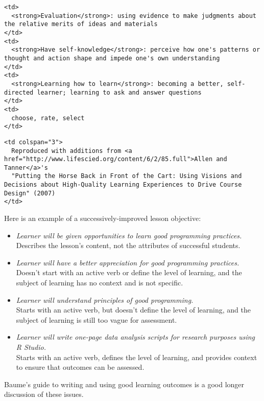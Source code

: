 \begin{verbatim}
<td>
  <strong>Evaluation</strong>: using evidence to make judgments about the relative merits of ideas and materials
</td>
<td>
  <strong>Have self-knowledge</strong>: perceive how one's patterns or thought and action shape and impede one's own understanding
</td>
<td>
  <strong>Learning how to learn</strong>: becoming a better, self-directed learner; learning to ask and answer questions
</td>
<td>
  choose, rate, select
</td>
\end{verbatim}

\begin{verbatim}
<td colspan="3">
  Reproduced with additions from <a href="http://www.lifescied.org/content/6/2/85.full">Allen and Tanner</a>'s
  "Putting the Horse Back in Front of the Cart: Using Visions and Decisions about High-Quality Learning Experiences to Drive Course Design" (2007)
</td>
\end{verbatim}

Here is an example of a successively-improved lesson objective:

\begin{itemize}
\item
  \textit{Learner will be given opportunities to learn good programming practices.}
  \\
  Describes the lesson's content, not the attributes of successful students.
\item
  \textit{Learner will have a better appreciation for good programming practices.}
  \\
  Doesn't start with an active verb or define the level of learning,
  and the subject of learning has no context and is not specific.
\item
  \textit{Learner will understand principles of good programming.}
  \\
  Starts with an active verb, but doesn't define the level of learning,
  and the subject of learning is still too vague for assessment.
\item
  \textit{Learner will write one-page data analysis scripts for research purposes using R Studio.}
  \\
  Starts with an active verb, defines the level of learning,
  and provides context to ensure that outcomes can be assessed.
\end{itemize}

Baume's guide to
writing and using good learning outcomes \cite{bib:baume-fixme} is a good longer discussion of these
issues.

